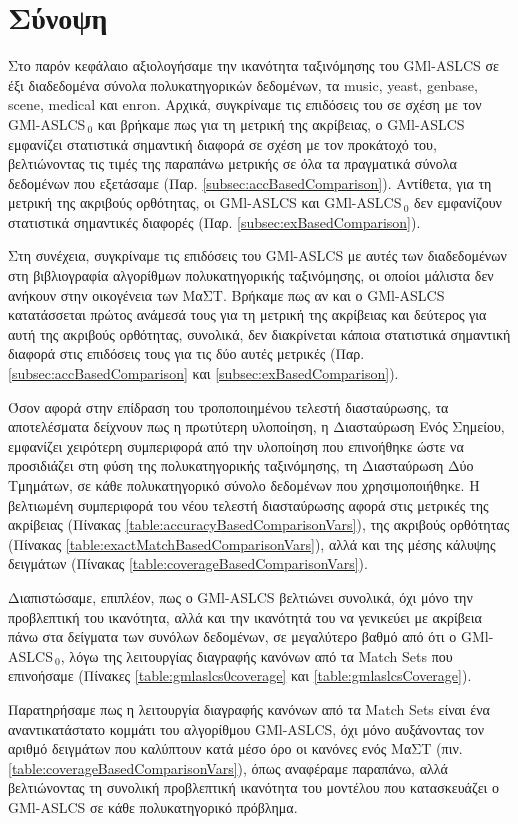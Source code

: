 \section{Σύνοψη}
Στο παρόν κεφάλαιο αξιολογήσαμε την ικανότητα ταξινόμησης του GMl-ASLCS σε έξι διαδεδομένα σύνολα πολυκατηγορικών δεδομένων, τα music, yeast, genbase, scene, medical και enron. Αρχικά, συγκρίναμε τις επιδόσεις του σε σχέση με τον GMl-ASLCS$_{\:0}$ και βρήκαμε πως για τη μετρική της ακρίβειας, ο GMl-ASLCS εμφανίζει στατιστικά σημαντική διαφορά σε σχέση με τον προκάτοχό του, βελτιώνοντας τις τιμές της παραπάνω μετρικής σε όλα τα πραγματικά σύνολα δεδομένων που εξετάσαμε (Παρ. \ref{subsec:accBasedComparison}). Αντίθετα, για τη μετρική της ακριβούς ορθότητας, οι GMl-ASLCS και GMl-ASLCS$_{\:0}$ δεν εμφανίζουν στατιστικά σημαντικές διαφορές (Παρ. \ref{subsec:exBasedComparison}). 

Στη συνέχεια, συγκρίναμε τις επιδόσεις του GMl-ASLCS με αυτές των διαδεδομένων στη βιβλιογραφία αλγορίθμων πολυκατηγορικής ταξινόμησης, οι οποίοι μάλιστα δεν ανήκουν στην οικογένεια των ΜαΣΤ. Βρήκαμε πως αν και ο GMl-ASLCS κατατάσσεται πρώτος ανάμεσά τους για τη μετρική της ακρίβειας και δεύτερος για αυτή της ακριβούς ορθότητας, συνολικά, δεν διακρίνεται κάποια στατιστικά σημαντική διαφορά στις επιδόσεις τους για τις δύο αυτές μετρικές (Παρ. \ref{subsec:accBasedComparison} και \ref{subsec:exBasedComparison}).

Όσον αφορά στην επίδραση του τροποποιημένου τελεστή διασταύρωσης, τα αποτελέσματα δείχνουν πως η πρωτύτερη υλοποίηση, η Διασταύρωση Ενός Σημείου, εμφανίζει χειρότερη συμπεριφορά από την υλοποίηση που επινοήθηκε ώστε να προσιδιάζει στη φύση της πολυκατηγορικής ταξινόμησης, τη Διασταύρωση Δύο Τμημάτων, σε κάθε πολυκατηγορικό σύνολο δεδομένων που χρησιμοποιήθηκε. Η βελτιωμένη συμπεριφορά του νέου τελεστή διασταύρωσης αφορά στις μετρικές της ακρίβειας (Πίνακας \ref{table:accuracyBasedComparisonVars}), της ακριβούς ορθότητας (Πίνακας \ref{table:exactMatchBasedComparisonVars}), αλλά και της μέσης κάλυψης δειγμάτων (Πίνακας \ref{table:coverageBasedComparisonVars}).

Διαπιστώσαμε, επιπλέον, πως ο GMl-ASLCS βελτιώνει συνολικά, όχι μόνο την προβλεπτική του ικανότητα, αλλά και την ικανότητά του να γενικεύει με ακρίβεια πάνω στα δείγματα των συνόλων δεδομένων, σε μεγαλύτερο βαθμό από ότι ο GMl-ASLCS$_{\:0}$, λόγω της λειτουργίας διαγραφής κανόνων από τα Match Sets που επινοήσαμε (Πίνακες \ref{table:gmlaslcs0coverage} και \ref{table:gmlaslcsCoverage}).

Παρατηρήσαμε πως η λειτουργία διαγραφής κανόνων από τα Match Sets είναι ένα αναντικατάστατο κομμάτι του αλγορίθμου GMl-ASLCS, όχι μόνο αυξάνοντας τον αριθμό δειγμάτων που καλύπτουν κατά μέσο όρο οι κανόνες ενός ΜαΣΤ (πιν. \ref{table:coverageBasedComparisonVars}), όπως αναφέραμε παραπάνω, αλλά βελτιώνοντας τη συνολική προβλεπτική ικανότητα του μοντέλου που κατασκευάζει ο GMl-ASLCS σε κάθε πολυκατηγορικό πρόβλημα. 

